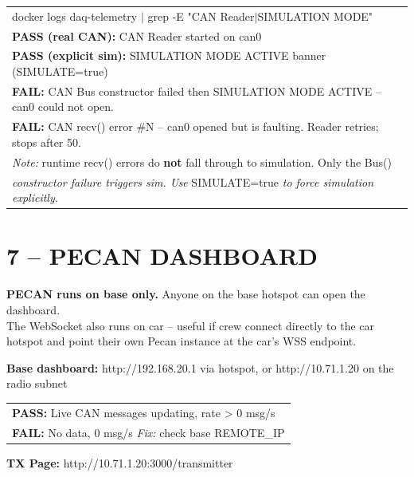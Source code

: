 \documentclass[a5paper,10pt]{article}
\newcommand{\cmd}[1]{{\ttfamily\scriptsize #1}}
\begin{document}
\noindent
\begin{tabular}{p{126mm}}
  \cmd{docker logs daq-telemetry $\vert$ grep -E "CAN Reader$\vert$SIMULATION MODE"} \\[1mm]
  \textbf{PASS (real CAN):} \cmd{CAN Reader started on can0} \\
  \textbf{PASS (explicit sim):} \cmd{SIMULATION MODE ACTIVE} banner (\cmd{SIMULATE=true}) \\
  \textbf{FAIL:} \cmd{CAN Bus constructor failed} then \cmd{SIMULATION MODE ACTIVE} -- \cmd{can0} could not open. \\
  \textbf{FAIL:} \cmd{CAN recv() error \#N} -- \cmd{can0} opened but is faulting. Reader retries; stops after 50. \\[1mm]
  \textit{Note:} runtime \cmd{recv()} errors do \textbf{not} fall through to simulation. Only the \cmd{Bus()} \\[1pt]
  \textit{constructor failure triggers sim. Use} \cmd{SIMULATE=true} \textit{to force simulation explicitly.} \\
\end{tabular}

\section*{7 -- PECAN DASHBOARD}

\textbf{PECAN runs on base only.} Anyone on the base hotspot can open the dashboard. \\
The WebSocket also runs on car -- useful if crew connect directly to the car hotspot
and point their own Pecan instance at the car's WSS endpoint.

\vspace{1mm}
\textbf{Base dashboard:} \cmd{http://192.168.20.1} via hotspot, or \cmd{http://10.71.1.20} on the radio subnet

\noindent
\begin{tabular}{p{126mm}}
  \textbf{PASS:} Live CAN messages updating, rate > 0 msg/s \\
  \textbf{FAIL:} No data, 0 msg/s \quad \textit{Fix:} check base REMOTE\_IP \\
\end{tabular}

\vspace{1mm}
\textbf{TX Page:} \cmd{http://10.71.1.20:3000/transmitter}
\end{document}
